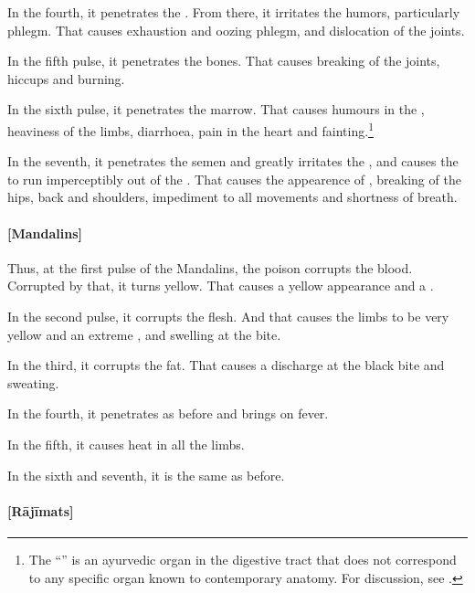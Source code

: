 \begin{translation}

In the fourth, it penetrates the .  From there, it 
irritates the humors, particularly phlegm. That causes exhaustion and oozing 
phlegm, and dislocation of the joints.

In the fifth pulse, it penetrates the bones.  That causes breaking of the joints, 
hiccups 
and burning.

In the sixth pulse, it penetrates the marrow.  That causes humours in the
, heaviness of the limbs, diarrhoea,
pain in the heart and fainting.\footnote{The “” is an ayurvedic organ in the digestive tract that does not
    correspond to any specific organ known to contemporary anatomy.  For
    discussion, see \cites[v.\,1,
    304]{josi-maha}[619]{meul-1974}[544--545]{das-2003}.}
    
In the seventh, it penetrates the semen and greatly irritates the
, and  causes the  to run
imperceptibly out of the .  That causes the appearence
of , breaking of the hips, back and shoulders, impediment 
to all movements and shortness of breath.
    
    
\paragraph{[Mandalins]}    

Thus, at the first pulse of the Mandalins, the poison corrupts the blood.  
Corrupted by that, it turns yellow. That causes a yellow appearance and a 
.

In the second pulse, it corrupts the flesh.  And that causes the
limbs to be very yellow and an extreme , and swelling at the bite.

In the third, it corrupts the fat.  That causes a discharge at the black bite and 
sweating.

In the fourth, it penetrates as before and brings on fever.

In the fifth, it causes heat in all the limbs. 

In the sixth and seventh, it is the same as before. 

\paragraph{[Rājīmats]}


\end{translation}
